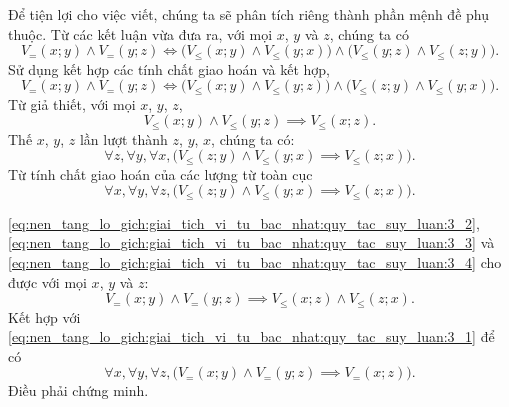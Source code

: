 Để tiện lợi cho việc viết, chúng ta sẽ phân tích riêng thành phần mệnh đề phụ thuộc. Từ các kết luận vừa đưa ra, với mọi $x$, $y$ và $z$, chúng ta có
\begin{equation*}
   V_=(x; y) \land V_=(y; z) \iff \big(V_\le(x; y) \land V_\le(y; x)\big) \land \big(V_\le(y; z) \land V_\le(z; y)\big).
\end{equation*}
Sử dụng kết hợp các tính chất giao hoán và kết hợp,
\begin{equation}
   V_=(x; y) \land V_=(y; z) \iff \big(V_\le(x; y) \land V_\le(y; z)\big) \land \big(V_\le(z; y) \land V_\le(y; x)\big).
   \label{eq:nen_tang_lo_gich:giai_tich_vi_tu_bac_nhat:quy_tac_suy_luan:3_2}
\end{equation}
Từ giả thiết, với mọi $x$, $y$, $z$,
\begin{equation}
    V_\le(x; y) \land V_\le(y; z) \implies V_\le(x; z).
   \label{eq:nen_tang_lo_gich:giai_tich_vi_tu_bac_nhat:quy_tac_suy_luan:3_3}
\end{equation}
Thế $x$, $y$, $z$ lần lượt thành $z$, $y$, $x$, chúng ta có:
\begin{equation*}
   \forall z, \forall y, \forall x, \big(V_\le(z; y) \land V_\le(y; x) \implies V_\le(z; x)\big).
\end{equation*}
Từ tính chất giao hoán của các lượng từ toàn cục
\begin{equation}
   \forall x, \forall y, \forall z, \big(V_\le(z; y) \land V_\le(y; x) \implies V_\le(z; x)\big).
   \label{eq:nen_tang_lo_gich:giai_tich_vi_tu_bac_nhat:quy_tac_suy_luan:3_4}
\end{equation}

\eqref{eq:nen_tang_lo_gich:giai_tich_vi_tu_bac_nhat:quy_tac_suy_luan:3_2}, \eqref{eq:nen_tang_lo_gich:giai_tich_vi_tu_bac_nhat:quy_tac_suy_luan:3_3} và \eqref{eq:nen_tang_lo_gich:giai_tich_vi_tu_bac_nhat:quy_tac_suy_luan:3_4} cho được với mọi $x$, $y$ và $z$:
\begin{equation*}
   V_=(x; y) \land V_=(y; z) \implies V_\le(x; z) \land V_\le(z; x).
\end{equation*}
Kết hợp với \eqref{eq:nen_tang_lo_gich:giai_tich_vi_tu_bac_nhat:quy_tac_suy_luan:3_1} để có
\begin{equation*}
   \forall x, \forall y, \forall z, \big(V_=(x; y) \land V_=(y; z) \implies V_=(x; z)\big).
\end{equation*}
Điều phải chứng minh.

